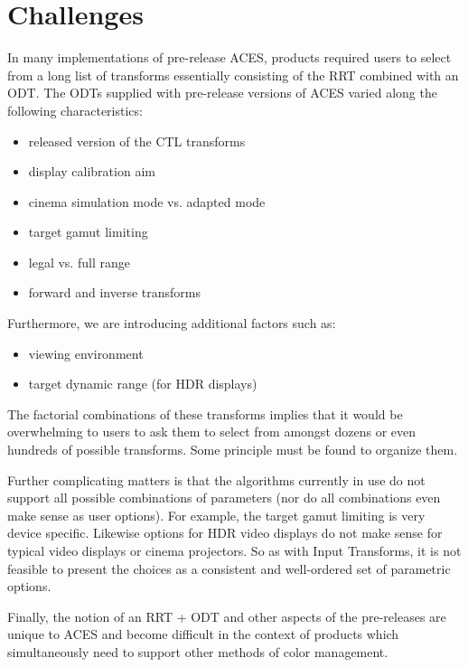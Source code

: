 \numberedformat
\chapter{Challenges}

In many implementations of pre-release ACES, products required users to select from a long list of transforms essentially consisting of the RRT combined with an ODT. The ODTs supplied with pre-release versions of ACES varied along the following characteristics:

\begin{itemize}
    \item released version of the CTL transforms
    \item display calibration aim
    \item cinema simulation mode vs. adapted mode
    \item target gamut limiting
    \item legal vs. full range
    \item forward and inverse transforms
\end{itemize}

Furthermore, we are introducing additional factors such as:

\begin{itemize}
    \item viewing environment
    \item target dynamic range (for HDR displays)
\end{itemize}

The factorial combinations of these transforms implies that it would be overwhelming to users to ask them to select from amongst dozens or even hundreds of possible transforms. Some principle must be found to organize them.

Further complicating matters is that the algorithms currently in use do not support all possible combinations of parameters (nor do all combinations even make sense as user options). For example, the target gamut limiting is very device specific. Likewise options for HDR video displays do not make sense for typical video displays or cinema projectors. So as with Input Transforms, it is not feasible to present the choices as a consistent and well-ordered set of parametric options.

Finally, the notion of an RRT + ODT and other aspects of the pre-releases are unique to ACES and become difficult in the context of products which simultaneously need to support other methods of color management.